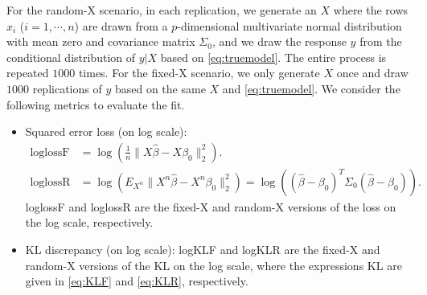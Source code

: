 For the random-X scenario, in each replication, we generate an $X$ where the rows $x_i$ ($i=1,\cdots,n$) are drawn from a $p$-dimensional multivariate normal distribution with mean zero and covariance matrix $\Sigma_0$, and we draw the response $y$ from the conditional distribution of $y|X$ based on \eqref{eq:truemodel}. The entire process is repeated $1000$ times. For the fixed-X scenario, we only generate $X$ once and draw $1000$ replications of $y$ based on the same $X$ and \eqref{eq:truemodel}. We consider the following metrics to evaluate the fit.
\begin{itemize}
	\item Squared error loss (on log scale):
	\begin{equation*}
  \begin{aligned}
		\text{loglossF} &= \log\left( \frac{1}{n}\lVert X\hat{\beta} - X\beta_0 \rVert_2^2 \right).\\
    \text{loglossR} &= \log\left( E_{X^n} \lVert X^n\hat\beta-X^n\beta_0 \rVert_2^2 \right) = \log\left( (\hat{\beta}-\beta_0)^T \Sigma_0 (\hat{\beta}-\beta_0) \right).
  \end{aligned}
	\end{equation*}
  loglossF and loglossR are the fixed-X and random-X versions of the loss on the log scale, respectively. 

	\item KL discrepancy (on log scale): logKLF and logKLR are the fixed-X and random-X versions of the KL on the log scale, where the expressions KL are given in \eqref{eq:KLF} and \eqref{eq:KLR}, respectively.

\end{itemize}
